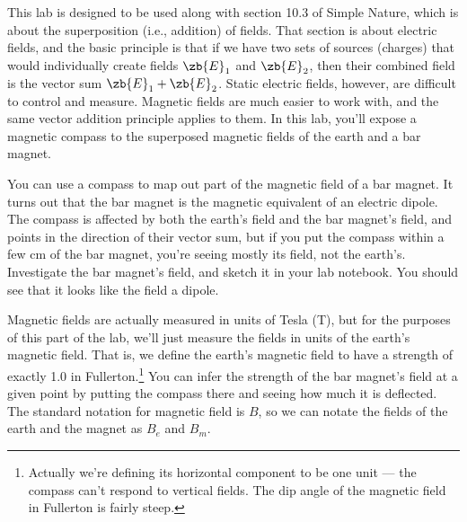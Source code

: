 \label{dipolefieldlab}\label{lab:dipole-field}

\label{fig:dipbofr}

\apparatus
{}


\introduction

This lab is designed to be used along with section 10.3 of Simple
Nature, which is about the superposition (i.e., addition) of fields. That section
is about electric fields, and the basic principle is that if we have
two sets of sources (charges) that would individually create
fields $\zb{E}_1$ and $\zb{E}_2$, then their combined field is
the vector sum $\zb{E}_1+\zb{E}_2$. Static electric fields, however,
are difficult to control and measure. Magnetic fields are much easier
to work with, and the same vector addition principle applies to them.
In this lab, you'll expose a magnetic compass to the superposed magnetic
fields of the earth and a bar magnet. 

You can use a compass to map out part of the magnetic
field of a bar magnet. It turns out that the bar magnet is the
magnetic equivalent of an electric dipole. The compass is affected by
both the earth's field and the bar magnet's field, and
points in the direction of their vector sum, but if you put the
compass within a few cm of the bar magnet, you're seeing mostly
its field, not the earth's. Investigate the bar magnet's field,
and sketch it in your lab notebook. You should see that it looks like
the field a dipole.

\label{dipole-compass}
Magnetic fields are actually measured in units of Tesla (T), but
for the purposes of this part of the lab, we'll just measure the fields
in units of the earth's magnetic field. That is, we define the
earth's magnetic field to have a strength of exactly 1.0 in
Fullerton.\footnote{Actually we're defining its horizontal component
to be one unit --- the compass can't respond to vertical fields.
The dip angle of the magnetic field in Fullerton is fairly steep.}
You can infer the strength of the bar magnet's field at a
given point by putting the compass there and seeing how
much it is deflected. The standard notation for magnetic field is
$B$, so we can notate the fields of the earth and the magnet as
$B_e$ and $B_m$. 

